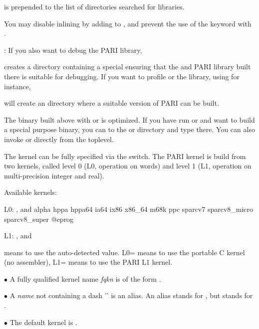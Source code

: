  is prepended to the list of directories
searched for libraries.

\noindent You may disable inlining by adding  to
, and prevent the use of the  keyword with
.

: If you also want to debug the PARI library,


\noindent creates a directory  containing a special
 ensuring that the  and PARI library built there is
suitable for debugging. If you want to
profile  or the library, using  for instance,


\noindent will create an  directory where a suitable version
of PARI can be built.

The  binary built above with  or  is
optimized. If you have run  or  and want to build
a special purpose binary, you can  to the  or 
directory and type  there. You can also invoke 
or  directly from the toplevel.

 The kernel can be fully specified via the
 switch. The PARI kernel is build from two kernels,
called level 0 (L0, operation on words) and level 1 (L1, operation on
multi-precision integer and real).

\noindent Available kernels:

L0: ,  and
\bprog
  alpha hppa hppa64 ia64 ix86 x86_64 m68k ppc sparcv7
  sparcv8_micro sparcv8_super
@eprog

L1: ,  and 

\noindent {} means to use the auto-detected value. L0= means
to use the portable C kernel (no assembler), L1= means to use the
PARI L1 kernel.

\noindent$\bullet$ A fully qualified kernel name \emph{fqkn} is of the form
.

\noindent$\bullet$ A \emph{name} not containing a dash '\kbd{-}' is an alias.
An alias stands for , but  stands for
.

\noindent$\bullet$ The default kernel is .

